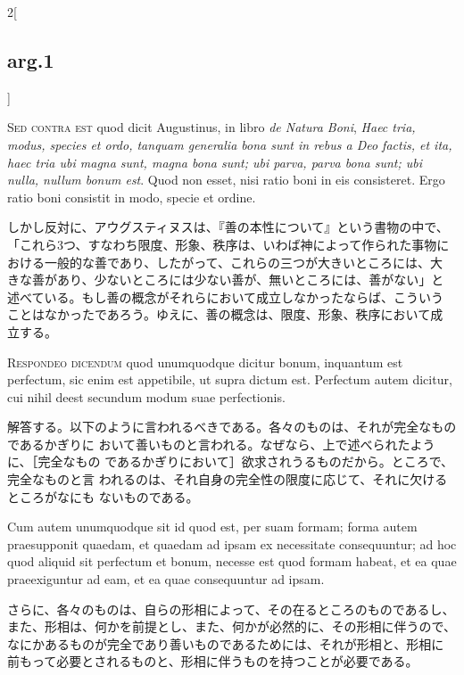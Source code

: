 \documentclass[paper=a4paper,fontsize=10pt,jafontsize=9pt,titlepage]{jlreq}
\begin{document}
\begin{paracol}{2}[\subsection{arg.1}]
\switchcolumn*[\subsection{s.c.}]

{\scshape Sed contra est} quod dicit Augustinus, in libro {\itshape de
 Natura Boni}, {\itshape Haec tria, modus, species et ordo, tanquam
 generalia bona sunt in rebus a Deo factis, et ita, haec tria ubi magna
 sunt, magna bona sunt; ubi parva, parva bona sunt; ubi nulla, nullum
 bonum est}. Quod non esset, nisi ratio boni in eis consisteret. Ergo
 ratio boni consistit in modo, specie et ordine.

\switchcolumn

しかし反対に、アウグスティヌスは、『善の本性について』という書物の中で、
 「これら3つ、すなわち限度、形象、秩序は、いわば神によって作られた事物に
 おける一般的な善であり、したがって、これらの三つが大きいところには、大
 きな善があり、少ないところには少ない善が、無いところには、善がない」と
 述べている。もし善の概念がそれらにおいて成立しなかったならば、こういう
 ことはなかったであろう。ゆえに、善の概念は、限度、形象、秩序において成
 立する。


{\scshape Respondeo dicendum} quod unumquodque dicitur bonum, inquantum est
 perfectum, sic enim est appetibile, ut supra dictum est. Perfectum
 autem dicitur, cui nihil deest secundum modum suae perfectionis.

\switchcolumn

解答する。以下のように言われるべきである。各々のものは、それが完全なものであるかぎりに
 おいて善いものと言われる。なぜなら、上で述べられたように、［完全なもの
 であるかぎりにおいて］欲求されうるものだから。ところで、完全なものと言
 われるのは、それ自身の完全性の限度に応じて、それに欠けるところがなにも
 ないものである。

\switchcolumn*

Cum autem unumquodque sit id quod est, per suam formam; forma autem
 praesupponit quaedam, et quaedam ad ipsam ex necessitate consequuntur;
 ad hoc quod aliquid sit perfectum et bonum, necesse est quod formam
 habeat, et ea quae praeexiguntur ad eam, et ea quae consequuntur ad
 ipsam.

\switchcolumn

さらに、各々のものは、自らの形相によって、その在るところのものであるし、
 また、形相は、何かを前提とし、また、何かが必然的に、その形相に伴うので、
 なにかあるものが完全であり善いものであるためには、それが形相と、形相に
 前もって必要とされるものと、形相に伴うものを持つことが必要である。


\end{paracol}
\end{document}
